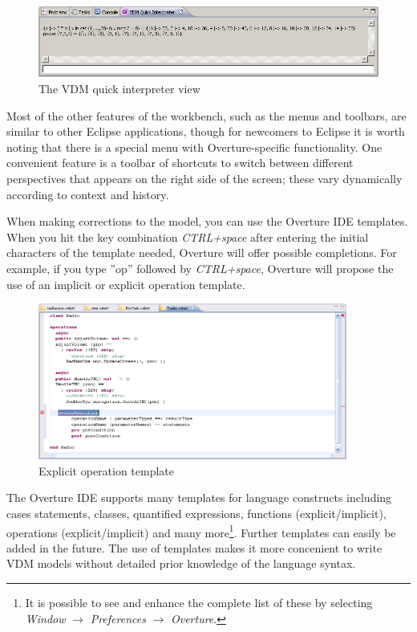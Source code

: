\begin{figure}[!htb]
\begin{center}
  \includegraphics[width=4.5in]{figures/quickinterpreter}
  \caption[labelInTOC]{The VDM quick interpreter view}
  \label{fig:QuickIntView}
\end{center}
\end{figure}

Most of the other features of the workbench, such as the menus and
toolbars, are similar to other Eclipse applications, though for
newcomers to Eclipse it is worth noting that there is a special menu
with Overture-specific functionality. One convenient feature is a
toolbar of shortcuts to switch between different perspectives that
appears on the right side of the screen; these vary dynamically
according to context and history.

When making corrections to the model, you can use the Overture IDE
templates. When you hit the key combination \textit{CTRL+space} after
entering the initial characters of the template needed, Overture will
offer possible completions. For example, if you type ''op'' followed by
\textit{CTRL+space}, Overture will propose the use of an implicit or
explicit operation template.

\begin{figure}
	\begin{center}
	\includegraphics[width=4in]{figures/OperationTemplateRT}
	\caption{Explicit operation template}
	\label{fig:userguide:operationTemplate}
	\end{center}
\end{figure}

The Overture IDE supports many templates for language constructs
including cases statements, classes, quantified expressions, functions
(explicit/implicit), operations (explicit/implicit) and many
more\footnote{It is possible to see and enhance the complete list of
  these by selecting \emph{Window} $\rightarrow$ \emph{Preferences}
  $\rightarrow$ \emph{Overture}.}. Further templates can easily be added in the future. The use of
templates makes it more concenient to write VDM models without
detailed prior knowledge of the language syntax.

